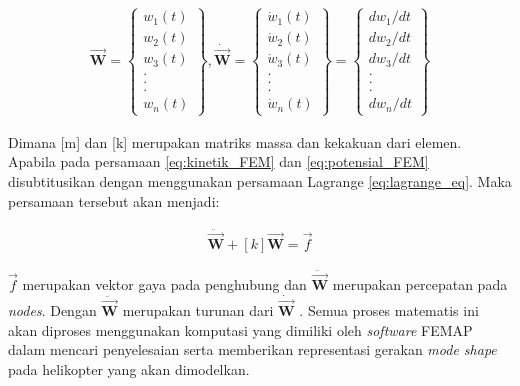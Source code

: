 \begin{align*}
\overrightarrow{\textbf{W}}=\left\{ \begin{matrix} w_1(t) \\ w_2(t) \\ w_3(t) \\ .\\ .\\ .\\ w_n(t) \end{matrix}\right\}, \dot{\overrightarrow{\textbf{W}}}=\left\{ \begin{matrix} \dot{w}_1(t) \\ \dot{w}_2(t) \\ \dot{w}_3(t) \\ .\\ .\\ .\\ \dot{w}_n(t) \end{matrix}\right\}=\left\{ \begin{matrix} dw_1/dt \\ dw_2/dt \\ dw_3/dt \\ .\\ .\\ .\\ dw_n/dt \end{matrix}\right\}
\end{align*}

Dimana [m] dan [k] merupakan matriks massa dan kekakuan dari elemen. Apabila pada persamaan \ref{eq:kinetik_FEM} dan \ref{eq:potensial_FEM} disubtitusikan dengan menggunakan persamaan Lagrange \ref{eq:lagrange_eq}. Maka persamaan tersebut akan menjadi:

\begin{align}
	[m]\ddot{\overrightarrow{\textbf{W}}}+[k]\overrightarrow{\textbf{W}}=\overrightarrow{f}
	\label{eq:kinetik+potensial_lagrange}
\end{align}

$\overrightarrow{f}$ merupakan vektor gaya pada penghubung dan $\ddot{\overrightarrow{\textbf{W}}}$ merupakan percepatan pada \textit{nodes}. Dengan $\ddot{\overrightarrow{\textbf{W}}}$ merupakan turunan dari $\dot{\overrightarrow{\textbf{W}}}$ \cite{rao2004mechanical}. Semua proses matematis ini akan diproses menggunakan komputasi yang dimiliki oleh \textit{software} FEMAP dalam mencari penyelesaian serta memberikan representasi gerakan \textit{mode shape} pada helikopter yang akan dimodelkan.
